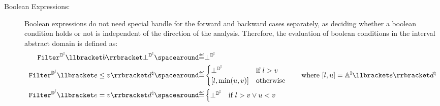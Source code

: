 \begin{description}
  \item[Boolean Expressions:]
  Boolean expressions do not need special handle for the forward and backward cases separately, as deciding whether a boolean condition holds or not is independent of the direction of the analysis.
  Therefore, the evaluation of boolean conditions in the interval abstract domain is defined as:
  \begin{align*}
    \intervalabstractdomainfilter \semanticsof{\defbexp} \intervalabstractdomainbottom &\DefeQ \intervalabstractdomainbottom \\
    \intervalabstractdomainfilter \semanticsof{\defaexp \le \defvalue} \defabstractvalue &\DefeQ \begin{cases}
      \intervalabstractdomainbottom & \text{if } l > \defvalue \\
      \interval{l}{\min(u, \defvalue)} & \text{otherwise}
    \end{cases} \tag*{where $\interval{l}{u} = \intervalaexp \semanticsof{\defaexp} \defabstractvalue$} \\
    \intervalabstractdomainfilter \semanticsof{\defaexp = \defvalue} \defabstractvalue &\DefeQ \begin{cases}
      \intervalabstractdomainbottom & \text{if } l > \defvalue \lor u < \defvalue \\

\end{cases}
\end{align*}
\end{description}
